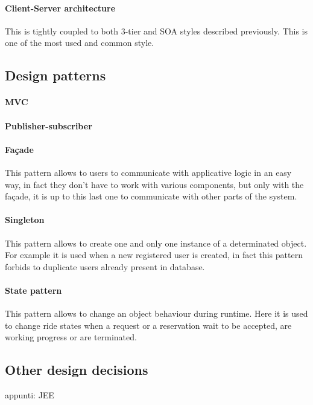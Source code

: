 \paragraph{Client-Server architecture}
This is tightly coupled to both 3-tier and SOA styles described previously. This is one of the most used and common style.
\subsection{Design patterns}
\paragraph{MVC}
\paragraph{Publisher-subscriber}
\paragraph{Fa\c{c}ade}
This pattern allows to users to communicate with applicative logic in an easy way, in fact they don't have to work with various components, but only with the fa\c{c}ade, it is up to this last one to communicate with other parts of the system.
\paragraph{Singleton}
This pattern allows to create one and only one instance of a determinated object. For example it is used when a new registered user is created, in fact this pattern forbids to duplicate users already present in database. 
\paragraph{State pattern}
This pattern allows to change an object behaviour during runtime. Here it is used to change ride states when a request or a reservation wait to be accepted, are working progress or are terminated.
\subsection{Other design decisions}
appunti: JEE